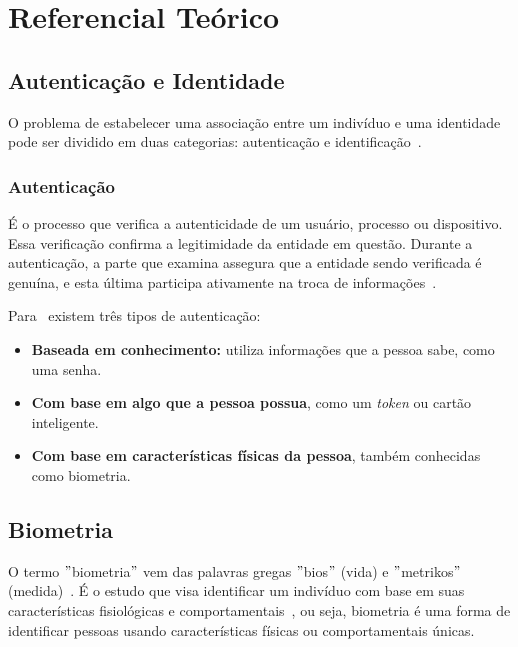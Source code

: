 

\chapter{Referencial Teórico}\label{ch:referencial_teorico}


\section{Autenticação e Identidade}\label{sec:autenticacaoeidentidade}
O problema de estabelecer uma associação entre um indivíduo e uma identidade pode ser dividido em duas categorias: autenticação e identificação~\cite{magalhaes2003biometria}.

\subsection{Autenticação}\label{subsec:autenticacao}
É o processo que verifica a autenticidade de um usuário, processo ou dispositivo.
Essa verificação confirma a legitimidade da entidade em questão.
Durante a autenticação, a parte que examina assegura que a entidade sendo verificada é genuína, e esta última participa ativamente na troca de informações~\cite{usmonov2021identification}.


Para~\cite{conti2017biometric} existem três tipos de autenticação\label{tipos-autenticacao}:

\begin{itemize}
    \item \textbf{Baseada em conhecimento:} utiliza informações que a pessoa sabe, como uma senha.
    \item \textbf{Com base em algo que a pessoa possua}, como um \textit{token} ou cartão inteligente.
    \item \textbf{Com base em características físicas da pessoa}, também conhecidas como biometria.
\end{itemize}


\section{Biometria}\label{sec:biometria}
O termo \("\)biometria\("\) vem das palavras gregas \("\)bios\("\) (vida) e \("\)metrikos\("\) (medida)~\cite{magalhaes2003biometria}.
É o estudo que visa identificar um indivíduo com base em suas características fisiológicas e comportamentais~\cite{handa2019comparative}, ou seja, biometria é uma forma de identificar pessoas usando características físicas ou comportamentais únicas.

